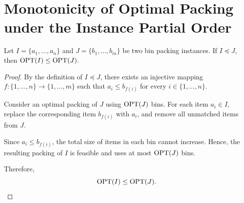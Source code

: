 \section{Monotonicity of Optimal Packing under the Instance Partial Order}
\label{app:partial-order-proof}

\begin{lemma}
\label{lem:monotonicity}
Let $I=\{a_1,\ldots,a_n\}$ and
$J=\{b_1,\ldots,b_m\}$ be two bin packing
instances. If $I\preceq J$, then
$\operatorname{OPT}(I)\leq\operatorname{OPT}(J).$
\end{lemma}


\begin{proof}
By the definition of $I\preceq J$, there exists
an injective mapping
$f:\{1,\ldots,n\}\to\{1,\ldots,m\}$
such that $a_i\leq b_{f(i)}$ for every
$i\in\{1,\ldots,n\}$.

Consider an optimal packing of $J$ using
$\operatorname{OPT}(J)$ bins. For each item $a_i\in I$,
replace the corresponding item $b_{f(i)}$
with $a_i$, and remove all unmatched items
from $J$.

Since $a_i\leq b_{f(i)}$, the total size
of items in each bin cannot increase.
Hence, the resulting packing of $I$ is
feasible and uses at most $\operatorname{OPT}(J)$ bins.

Therefore,
\[
    \operatorname{OPT}(I)\leq\operatorname{OPT}(J).
\]
\end{proof}

